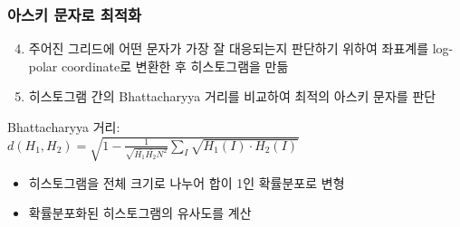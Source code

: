 \documentclass{beamer}
\begin{document}
	\begin{frame}{}
		\frametitle{아스키 문자로 최적화}
		\begin{enumerate}
			\setcounter{enumi}{3}
			\item 주어진 그리드에 어떤 문자가 가장 잘 대응되는지 판단하기 위하여 좌표계를 log-polar coordinate로 변환한 후 히스토그램을 만듦\cite{log-polar}
			\item 히스토그램 간의 Bhattacharyya 거리를 비교하여 최적의 아스키 문자를 판단\cite{bhattacharyya}
		\end{enumerate}
		\vspace{1em}
		Bhattacharyya 거리: \\
		\vspace{0.5em}
		\centering
		$ \displaystyle d(H_1,H_2) = \sqrt{1 - \frac{1}{\sqrt{\bar{H_1} \bar{H_2} N^2}} \sum_I \sqrt{H_1(I) \cdot H_2(I)}} $
		\vspace{0.5em}
		\begin{itemize}
			\item 히스토그램을 전체 크기로 나누어 합이 1인 확률분포로 변형
			\item 확률분포화된 히스토그램의 유사도를 계산
		\end{itemize}
	\end{frame}
\end{document}
